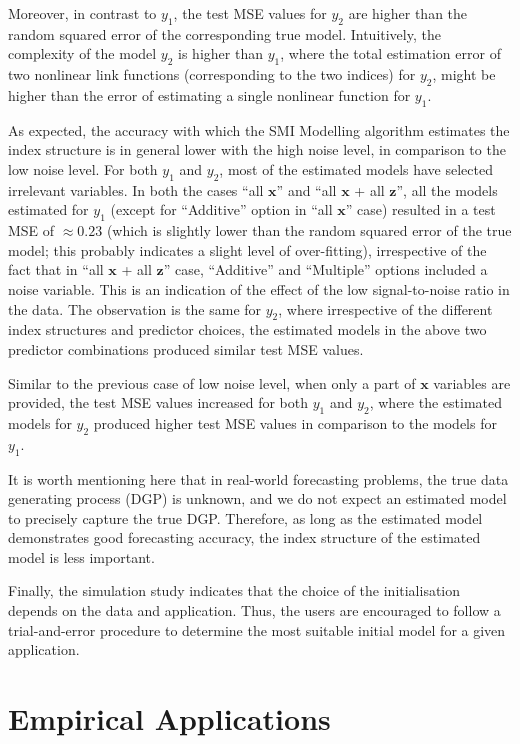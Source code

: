 \documentclass[
  11pt,
  a4paper,
]{article}
\begin{document}
Moreover, in contrast to \(y_{1}\), the test MSE values for \(y_{2}\)
are higher than the random squared error of the corresponding true
model. Intuitively, the complexity of the model \(y_{2}\) is higher than
\(y_{1}\), where the total estimation error of two nonlinear link
functions (corresponding to the two indices) for \(y_{2}\), might be
higher than the error of estimating a single nonlinear function for
\(y_{1}\).

As expected, the accuracy with which the SMI Modelling algorithm
estimates the index structure is in general lower with the high noise
level, in comparison to the low noise level. For both \(y_{1}\) and
\(y_{2}\), most of the estimated models have selected irrelevant
variables. In both the cases ``all \(\bm{x}\)'' and ``all \(\bm{x}\) +
all \(\bm{z}\)'', all the models estimated for \(y_{1}\) (except for
``Additive'' option in ``all \(\bm{x}\)'' case) resulted in a test MSE
of \(\approx 0.23\) (which is slightly lower than the random squared
error of the true model; this probably indicates a slight level of
over-fitting), irrespective of the fact that in ``all \(\bm{x}\) + all
\(\bm{z}\)'' case, ``Additive'' and ``Multiple'' options included a
noise variable. This is an indication of the effect of the low
signal-to-noise ratio in the data. The observation is the same for
\(y_{2}\), where irrespective of the different index structures and
predictor choices, the estimated models in the above two predictor
combinations produced similar test MSE values.

Similar to the previous case of low noise level, when only a part of
\(\bm{x}\) variables are provided, the test MSE values increased for
both \(y_{1}\) and \(y_{2}\), where the estimated models for \(y_{2}\)
produced higher test MSE values in comparison to the models for
\(y_{1}\).

It is worth mentioning here that in real-world forecasting problems, the
true data generating process (DGP) is unknown, and we do not expect an
estimated model to precisely capture the true DGP. Therefore, as long as
the estimated model demonstrates good forecasting accuracy, the index
structure of the estimated model is less important.

Finally, the simulation study indicates that the choice of the
initialisation depends on the data and application. Thus, the users are
encouraged to follow a trial-and-error procedure to determine the most
suitable initial model for a given application.

\section{Empirical Applications}\label{sec-application}
\end{document}
